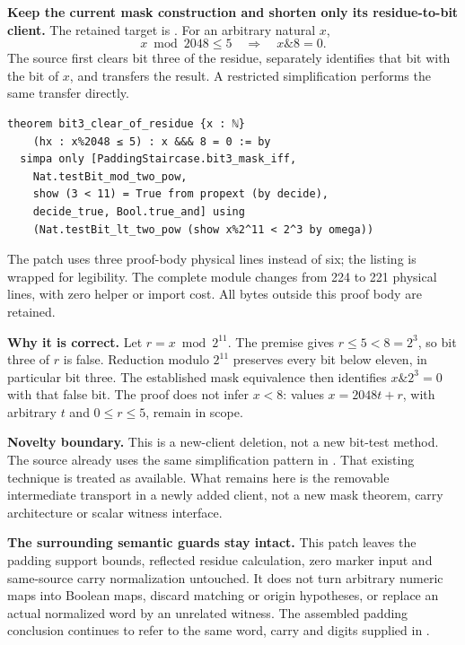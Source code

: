 \textbf{Keep the current mask construction and shorten only its residue-to-bit client.}
The retained target is . For an arbitrary natural $x$,
\[
 x\bmod2048\le5\quad\Longrightarrow\quad x\mathbin{\&}8=0.
\]
The source first clears bit three of the residue, separately identifies that bit with the bit of $x$, and transfers the result. A restricted simplification performs the same transfer directly.

\begin{lstlisting}
theorem bit3_clear_of_residue {x : ℕ}
    (hx : x%2048 ≤ 5) : x &&& 8 = 0 := by
  simpa only [PaddingStaircase.bit3_mask_iff,
    Nat.testBit_mod_two_pow,
    show (3 < 11) = True from propext (by decide),
    decide_true, Bool.true_and] using
    (Nat.testBit_lt_two_pow (show x%2^11 < 2^3 by omega))
\end{lstlisting}

The patch uses three proof-body physical lines instead of six; the listing is wrapped for legibility. The complete module changes from 224 to 221 physical lines, with zero helper or import cost. All bytes outside this proof body are retained.

\textbf{Why it is correct.} Let $r=x\bmod2^{11}$. The premise gives $r\le5<8=2^3$, so bit three of $r$ is false. Reduction modulo $2^{11}$ preserves every bit below eleven, in particular bit three. The established mask equivalence then identifies $x\mathbin{\&}2^3=0$ with that false bit. The proof does not infer $x<8$: values $x=2048t+r$, with arbitrary $t$ and $0\le r\le5$, remain in scope.

\textbf{Novelty boundary.} This is a new-client deletion, not a new bit-test method. The source already uses the same  simplification pattern in . That existing technique is treated as available. What remains here is the removable intermediate transport in a newly added client, not a new mask theorem, carry architecture or scalar witness interface.

\textbf{The surrounding semantic guards stay intact.} This patch leaves the padding support bounds, reflected residue calculation, zero marker input and same-source carry normalization untouched. It does not turn arbitrary numeric maps into Boolean maps, discard matching or origin hypotheses, or replace an actual normalized word by an unrelated witness. The assembled padding conclusion continues to refer to the same word, carry and digits supplied in .

